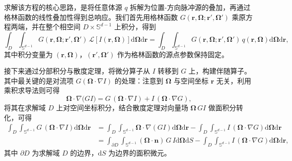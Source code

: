 求解该方程的核心思路，是将任意体源 $q$ 拆解为位置-方向脉冲源的叠加，再通过格林函数的线性叠加性得到总响应。我们首先用格林函数 $G(\boldsymbol{r},\boldsymbol{\Omega};\boldsymbol{r}',\boldsymbol{\Omega}')$ 乘原方程两端，并在整个相空间 $D\times\mathbb{S}^{d-1}$ 上积分，得到
\begin{equation}
    \int_{D}\int_{\mathbb{S}^{d-1}} G(\boldsymbol{r},\boldsymbol{\Omega};\boldsymbol{r}',\boldsymbol{\Omega}')\, \mathcal{L}[I(\boldsymbol{r},\boldsymbol{\Omega})]\mathrm{d}\boldsymbol{\Omega}\mathrm{d}\boldsymbol{r}
    = \int_{D}\int_{\mathbb{S}^{d-1}} G(\boldsymbol{r},\boldsymbol{\Omega};\boldsymbol{r}',\boldsymbol{\Omega}')\, q(\boldsymbol{r},\boldsymbol{\Omega})\mathrm{d}\boldsymbol{\Omega}\mathrm{d}\boldsymbol{r},
\end{equation}
其中积分变量为 $(\boldsymbol{r},\boldsymbol{\Omega})$，$(\boldsymbol{r}',\boldsymbol{\Omega}')$ 作为格林函数的源点参数保持固定。

接下来通过分部积分与散度定理，将微分算子从 $I$ 转移到 $G$ 上，构建伴随算子。其中最关键的是对流项 $G(\boldsymbol{\Omega}\cdot\nabla I)$ 的处理：注意到 $\boldsymbol{\Omega}$ 与空间坐标 $\boldsymbol{r}$ 无关，利用乘积求导法则可得
\begin{equation}
    \boldsymbol{\Omega}\cdot\nabla\bigl(GI\bigr)=G\,(\boldsymbol{\Omega}\cdot\nabla I)+I\,(\boldsymbol{\Omega}\cdot\nabla G),
\end{equation}
将其在求解域 $D$ 上对空间坐标积分，结合散度定理对向量场 $\boldsymbol{\Omega}\,GI$ 做面积分转化，可得
\begin{equation}
    \begin{aligned}
        \int_{D}\int_{\mathbb{S}^{d-1}} G\,(\boldsymbol{\Omega}\cdot\nabla I)\mathrm{d}\boldsymbol{\Omega}\mathrm{d}\boldsymbol{r}
         & = \int_{D}\int_{\mathbb{S}^{d-1}} \boldsymbol{\Omega}\cdot\nabla(GI)\mathrm{d}\boldsymbol{\Omega}\mathrm{d}\boldsymbol{r}
        - \int_{D}\int_{\mathbb{S}^{d-1}} I\,(\boldsymbol{\Omega}\cdot\nabla G)\mathrm{d}\boldsymbol{\Omega}\mathrm{d}\boldsymbol{r}          \\
         & = \int_{\partial D}\int_{\mathbb{S}^{d-1}} (\boldsymbol{\Omega}\cdot\boldsymbol{n})\,G\,I\mathrm{d}\boldsymbol{\Omega}\mathrm{d} S
        - \int_{D}\int_{\mathbb{S}^{d-1}} I\,(\boldsymbol{\Omega}\cdot\nabla G)\mathrm{d}\boldsymbol{\Omega}\mathrm{d}\boldsymbol{r},
    \end{aligned}
\end{equation}
其中 $\partial D$ 为求解域 $D$ 的边界，$\mathrm{d}S$ 为边界的面积微元。

